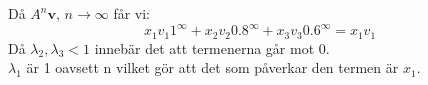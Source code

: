 Då $A^n\bm{v}\text{, }n\rightarrow\infty$ får vi:
\begin{equation*}
    x_1v_1 1^\infty+x_2v_2 0.8^\infty+x_3v_3 0.6^\infty=x_1v_1
\end{equation*}
Då $\lambda_2,\lambda_3<1$ innebär det att termenerna går mot 0.\\
$\lambda_1$ är 1 oavsett n vilket gör att det som påverkar den termen är $x_1$.
